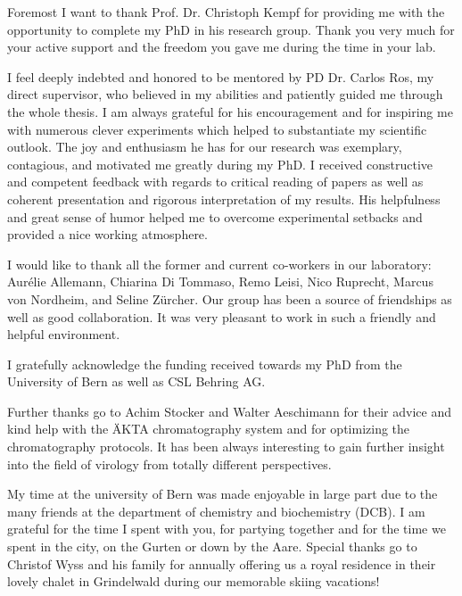 \begin{addmargin}{0.025\textwidth}
\noindent
Foremost I want to thank Prof. Dr. Christoph Kempf for providing me with the opportunity to complete my PhD in his research group. Thank you very much for your active support and the freedom you gave me during the time in your lab.  

\par\medskip 
\noindent
I feel deeply indebted and honored to be mentored by PD Dr. Carlos Ros, my direct supervisor, who believed in my abilities and patiently guided me through the whole thesis. I am always grateful for his encouragement and for inspiring me with numerous clever experiments which helped to substantiate my scientific outlook. The joy and enthusiasm he has for our research was exemplary, contagious, and motivated me greatly during my PhD. I received constructive and competent feedback with regards to critical reading of papers as well as coherent presentation and rigorous interpretation of my results. His helpfulness and great sense of humor helped me to overcome experimental setbacks and provided a nice working atmosphere.    
    
\par\medskip 
\noindent
I would like to thank all the former and current co-workers in our laboratory: Aurélie Allemann, Chiarina Di Tommaso, Remo Leisi, Nico Ruprecht, Marcus von Nordheim, and Seline Zürcher. Our group has been a source of friendships as well as good collaboration. It was very pleasant to work in such a friendly and helpful environment. 

\par\medskip 
\noindent
I gratefully acknowledge the funding received towards my PhD from the University of Bern as well as CSL Behring AG.

\par\medskip 
\noindent
Further thanks go to Achim Stocker and Walter Aeschimann for their advice and kind help with the ÄKTA chromatography system and for optimizing the chromatography protocols. It has been always interesting to gain further insight into the field of virology from totally different perspectives.      

\par\medskip 
\noindent
My time at the university of Bern was made enjoyable in large part due to the many friends at the department of chemistry and biochemistry (DCB). I am grateful for the time I spent with you, for partying together and for the time we spent in the city, on the Gurten or down by the Aare. Special thanks go to Christof Wyss and his family for annually offering us a royal residence in their lovely chalet in Grindelwald during our memorable skiing vacations! 


\end{addmargin}
